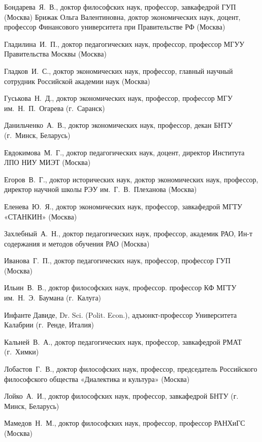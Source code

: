 \begin{multicols}{2}
    \noindent Бондарева Я. В., доктор философских наук, профессор, завкафедрой ГУП (Москва)
    Брижак Ольга Валентиновна, доктор экономических наук, доцент, профессор Финансового университета при Правительстве РФ (Москва)
    
    \noindent Гладилина И. П., доктор педагогических наук, профессор, профессор МГУУ Правительства Москвы (Москва)
    
    \noindent Гладков И. С., доктор экономических наук, профессор, главный научный сотрудник Российской академии наук (Москва)
    
    \noindent Гуськова Н. Д., доктор экономических наук, профессор, профессор МГУ им. Н. П. Огарева (г. Саранск)
    
    \noindent Данильченко А. В., доктор экономических наук, профессор, декан БНТУ (г. Минск, Беларусь)
    
    \noindent Евдокимова М. Г., доктор педагогических наук, доцент, директор Института ЛПО НИУ МИЭТ (Москва)
    
    \noindent Егоров В. Г., доктор исторических наук, доктор экономических наук, профессор, директор научной школы РЭУ им. Г. В. Плеханова (Москва)
   
    \noindent Еленева Ю. Я., доктор экономических наук, профессор, завкафедрой МГТУ «СТАНКИН» (Москва)
    
    \noindent Захлебный А. Н., доктор педагогических наук, профессор, академик РАО, Ин-т содержания и методов обучения РАО (Москва)
    
    \noindent Иванова Г. П., доктор педагогических наук, профессор, профессор ГУП (Москва)
    
    \noindent Ильин В. В., доктор философских наук, профессор. профессор КФ МГТУ им. Н. Э. Баумана (г. Калуга)
    
    \noindent Инфанте Давиде, Dr. Sci. (Polit. Econ.), адъюнкт-профессор Университета Калабрии (г. Ренде, Италия)
    
    \noindent Кальней В. А., доктор педагогических наук, профессор, завкафедрой РМАТ (г. Химки)
    
    \noindent Лобастов Г. В., доктор философских наук, профессор, председатель Российского философского общества «Диалектика и культура» (Москва)
    
    \noindent Лойко А. И., доктор философских наук, профессор, завкафедрой БНТУ (г. Минск, Беларусь)
    
    \noindent Мамедов Н. М., доктор философских наук, профессор, профессор РАНХиГС (Москва)
    

\end{multicols}
